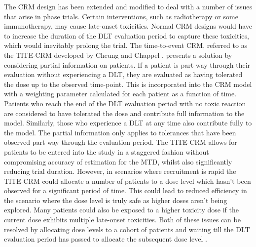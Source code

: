 \documentclass[a4paper, 11pt]{article} %
\newcommand{\RN}[1]{
	\textup{\uppercase\expandafter{\romannumeral#1}}} %
\begin{document}
\noindent The CRM design has been extended and modified to deal with a number of issues that arise in phase\RN{1} trials. Certain interventions, such as radiotherapy or some immunotherapy,  may cause late-onset toxicities. Normal CRM designs would have to increase the duration of the DLT evaluation period to capture these toxicities, which would inevitably prolong the trial. The time-to-event CRM, referred to as the TITE-CRM developed by Cheung and Chappel \cite{Cheung2000}, presents a solution by considering partial information on patients. If a patient is part way through their evaluation without experiencing a DLT, they are evaluated as having tolerated the dose up to the observed time-point. This is incorporated into the CRM model with a weighting parameter calculated for each patient as a function of time. Patients who reach the end of the DLT evaluation period with no toxic reaction are considered to have tolerated the dose and contribute full information to the model. Similarly, those who experience a DLT at any time also contribute fully to the model. The partial information only applies to tolerances that have been observed part way through the evaluation period. The TITE-CRM allows for patients to be entered into the study in a staggered fashion without compromising accuracy of estimation for the MTD, whilst also significantly reducing trial duration. However, in scenarios where recruitment is rapid the TITE-CRM could allocate a number of patients to a dose level which hasn't been observed for a significant period of time. This could lead to reduced efficiency in the scenario where the dose level is truly safe as higher doses aren't being explored. Many patients could also be exposed to a higher toxicity dose if the current dose exhibits multiple late-onset toxicities. Both of these issues can be resolved by allocating dose levels to a cohort of patients and waiting till the DLT evaluation period has passed to allocate the subsequent dose level \cite{Polley2019}. \\
\end{document}
